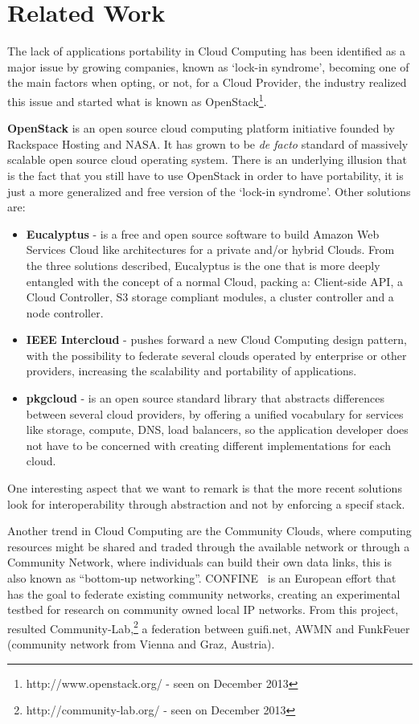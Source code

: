 
\section{Related Work}

The lack of applications portability in Cloud Computing has been identified as a major issue by growing companies, known as `lock-in syndrome', becoming one of the main factors when opting, or not, for a Cloud Provider, the industry realized this issue and started what is known as OpenStack\footnote{http://www.openstack.org/ - seen on December 2013}.

\textbf{OpenStack} is an open source cloud computing platform initiative founded by Rackspace Hosting and NASA. It has grown to be \textit{de facto} standard of massively scalable open source cloud operating system. There is an underlying illusion that is the fact that you still have to use OpenStack in order to have portability, it is just a more generalized and free version of the `lock-in syndrome'. Other solutions are:
\begin{itemize}
  \item \textbf{Eucalyptus} - is a free and open source software to build Amazon Web Services Cloud like architectures for a private and/or hybrid Clouds. From the three solutions described, Eucalyptus is the one that is more deeply entangled with the concept of a normal Cloud, packing a: Client-side API, a Cloud Controller, S3 storage compliant modules, a cluster controller and a node controller.
  \item \textbf{IEEE Intercloud} - pushes forward a new Cloud Computing design pattern, with the possibility to federate several clouds operated by enterprise or other providers, increasing the scalability and portability of applications.
  \item \textbf{pkgcloud} - is an open source standard library that abstracts differences between several cloud providers, by offering a unified vocabulary for services like storage, compute, DNS, load balancers, so the application developer does not have to be concerned with creating different implementations for each cloud.
\end{itemize}

One interesting aspect that we want to remark is that the more recent solutions look for interoperability through abstraction and not by enforcing a specif stack.

Another trend in Cloud Computing are the Community Clouds, where computing resources might be shared and traded through the available network or through a Community Network, where individuals can build their own data links, this is also known as ``bottom-up networking''. CONFINE~\cite{Navarro} is an European effort that has the goal to federate existing community networks, creating an experimental testbed for research on community owned local IP networks. From this project, resulted Community-Lab,\footnote{http://community-lab.org/ - seen on December 2013} a federation between guifi.net, AWMN and FunkFeuer (community network from Vienna and Graz, Austria).

